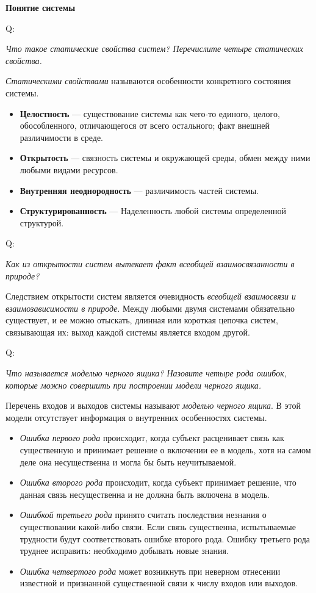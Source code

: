\documentclass{article}
\newcommand{\note}[1]{\textit{#1}}
\renewcommand{\subsection}[1]{
	\vspace{2em}
	\begin{flushright}
		\large
		\textbf{#1}
	\end{flushright}
	}
\newcommand{\define}[2]{
	\textbf{#1} --- #2
	}
\newcommand{\question}[2]{
	\begin{flushright}
		Q:\hspace{2ex}\vline\hspace{2ex}
		\begin{minipage}{0.9\textwidth}
			\large
			\textit{#1}
		\end{minipage}
	\end{flushright}
	\begin{center}
		\begin{minipage}{0.95\textwidth}
			#2
		\end{minipage}
	\end{center}
	}
\begin{document}
\subsection{Понятие системы}
\question{Что такое статические свойства систем? Перечислите четыре статических свойства.}{\note{Статическими свойствами} называются особенности конкретного состояния системы.
	\begin{itemize}
		\item \define{Целостность}{существование системы как чего-то единого, целого, обособленного, отличающегося от всего остального; факт внешней различимости в среде.}
		\item \define{Открытость}{связность системы и окружающей среды, обмен между ними любыми видами ресурсов.}
		\item \define{Внутренняя неоднородность}{различимость частей системы.}
		\item \define{Структурированность}{Наделенность любой системы определенной структурой.}
	\end{itemize}}
\question{Как из открытости систем вытекает факт всеобщей взаимосвязанности в природе?}{Следствием открытости систем является очевидность \note{всеобщей взаимосвязи и взаимозависимости в природе}. Между любыми двумя системами обязательно существует, и ее можно отыскать, длинная или короткая цепочка систем, связывающая их: выход каждой системы является входом другой.}
\question{Что называется моделью черного ящика? Назовите четыре рода ошибок, которые можно совершить при построении модели черного ящика.}{Перечень входов и выходов системы называют \note{моделью черного ящика}. В этой модели отсутствует информация о внутренних особенностях системы.
	\begin{itemize}
		\item \note{Ошибка первого рода} происходит, когда субъект расценивает связь как существенную и принимает решение о включении ее в модель, хотя на самом деле она несущественна и могла бы быть неучитываемой.
		\item \note{Ошибка второго рода} происходит, когда субъект принимает решение, что данная связь несущественна и не должна быть включена в модель.
		\item \note{Ошибкой третьего рода} принято считать последствия незнания о существовании какой-либо связи. Если связь существенна, испытываемые трудности будут соответствовать ошибке второго рода. Ошибку третьего рода труднее исправить: необходимо добывать новые знания.
		\item \note{Ошибка четвертого рода} может возникнуть при неверном отнесении известной и признанной существенной связи к числу входов или выходов. 
	\end{itemize}}
\end{document}
